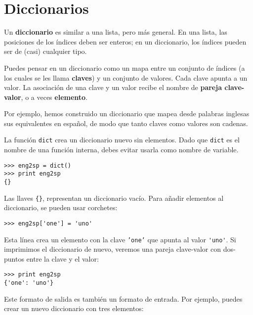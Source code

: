 
\chapter{Diccionarios}

Un {\bf diccionario} es similar a una lista, pero más general. En una lista,
las posiciones de los índices deben ser enteros; en un diccionario,
los índices pueden ser de (casi) cualquier tipo.

Puedes pensar en un diccionario como un mapa entre un conjunto de índices
(a los cuales se les llama {\bf claves}) y un conjunto de valores. Cada clave apunta a un
valor. La asociación de una clave y un valor recibe el nombre de {\bf
pareja clave-valor}, o a veces {\bf elemento}.

Por ejemplo, hemos construido un diccionario que mapea desde palabras inglesas
sus equivalentes en español, de modo que tanto claves como valores son cadenas.

La función {\tt dict} crea un diccionario nuevo sin elementos.
Dado que {\tt dict} es el nombre de una función interna, debes
evitar usarla como nombre de variable.


\beforeverb
\begin{verbatim}
>>> eng2sp = dict()
>>> print eng2sp
{}
\end{verbatim}
\afterverb

Las llaves \verb"{}", representan un diccionario vacío.
Para añadir elementos al diccionario, se pueden usar corchetes:


\beforeverb
\begin{verbatim}
>>> eng2sp['one'] = 'uno'
\end{verbatim}
\afterverb
%
Esta línea crea un elemento con la clave {\tt 'one'}
que apunta al valor \verb"'uno'". Si imprimimos el
diccionario de nuevo, veremos una pareja clave-valor con dos-puntos
entre la clave y el valor:

\beforeverb
\begin{verbatim}
>>> print eng2sp
{'one': 'uno'}
\end{verbatim}
\afterverb
%
Este formato de salida es también un formato de entrada. Por ejemplo,
puedes crear un nuevo diccionario con tres elementos:

